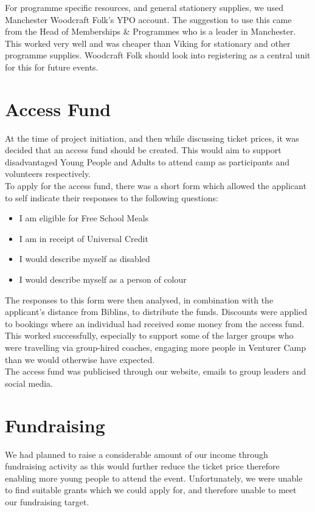 For programme specific resources, and general stationery supplies, we used Manchester Woodcraft Folk's YPO account. The suggestion to use this came from the Head of Memberships \& Programmes who is a leader in Manchester. This worked very well and was cheaper than Viking for stationary and other programme supplies. Woodcraft Folk should look into registering as a central unit for this for future events. 

\section{Access Fund}
At the time of project initiation, and then while discussing ticket prices, it was decided that an access fund should be created. This would aim to support disadvantaged Young People and Adults to attend camp as participants and volunteers respectively.\\

To apply for the access fund, there was a short form which allowed the applicant to self indicate their responses to the following questions:
\begin{itemize}
    \item I am eligible for Free School Meals
    \item I am in receipt of Universal Credit
    \item I would describe myself as disabled
    \item I would describe myself as a person of colour
\end{itemize}
The responses to this form were then analysed, in combination with the applicant's distance from Biblins, to distribute the funds. Discounts were applied to bookings where an individual had received some money from the access fund.\\

This worked successfully, especially to support some of the larger groups who were travelling via group-hired coaches, engaging more people in Venturer Camp than we would otherwise have expected.\\

The access fund was publicised through our website, emails to group leaders and social media.

\section{Fundraising}
We had planned to raise a considerable amount of our income through fundraising activity as this would further reduce the ticket price therefore enabling more young people to attend the event. Unfortunately, we were unable to find suitable grants which we could apply for, and therefore unable to meet our fundraising target.\\

